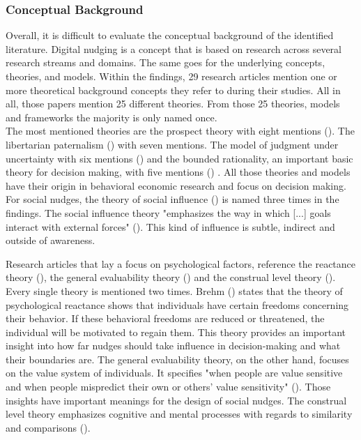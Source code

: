 \subsubsection{Conceptual Background} 
Overall, it is difficult to evaluate the conceptual background of the identified literature. Digital nudging is a concept that is based on research across several research streams and domains. The same goes for the underlying concepts, theories, and models. Within the findings, 29 research articles mention one or more theoretical background concepts they refer to during their studies. All in all, those papers mention 25 different theories. From those 25 theories, models and frameworks the majority is only named once. 
\\

The most mentioned theories are the prospect theory with eight mentions (\cite{kahneman_prospect_1979}). The libertarian paternalism (\cite{thaler_nudge:_2009}) with seven mentions. The model of judgment under uncertainty with six mentions (\cite{tversky_judgment_1974}) and the bounded rationality, an important basic theory for decision making, with five mentions (\cite{simon_behavioral_1955}) . All those theories and models have their origin in behavioral economic research and focus on decision making.
\\

For social nudges, the theory of social influence (\cite{cialdini_social_2004}) is named three times in the findings. The social influence theory "emphasizes the way in which [...] goals interact with external forces" (\cite[p.591]{cialdini_social_2004}). This kind of influence is subtle, indirect and outside of awareness.

Research articles that lay a focus on psychological factors, reference the reactance theory (\cite{brehm_theory_1966}), the general evaluability theory (\cite{hsee_general_2010}) and the construal level theory (\cite{trope_construal-level_2010}). Every single theory is mentioned two times. Brehm (\citeyear{brehm_theory_1966}) states that the theory of psychological reactance shows that individuals have certain freedoms concerning their behavior. If these behavioral freedoms are reduced or threatened, the individual will be motivated to regain them. This theory provides an important insight into how far nudges should take influence in decision-making and what their boundaries are. The general evaluability theory, on the other hand, focuses on the value system of individuals. It specifies "when people are value sensitive and when people mispredict their own or others' value sensitivity" (\cite[p.343]{hsee_general_2010}). Those insights have important meanings for the design of social nudges. The construal level theory emphasizes cognitive and mental processes with regards to similarity and comparisons (\cite{trope_construal-level_2010}).

